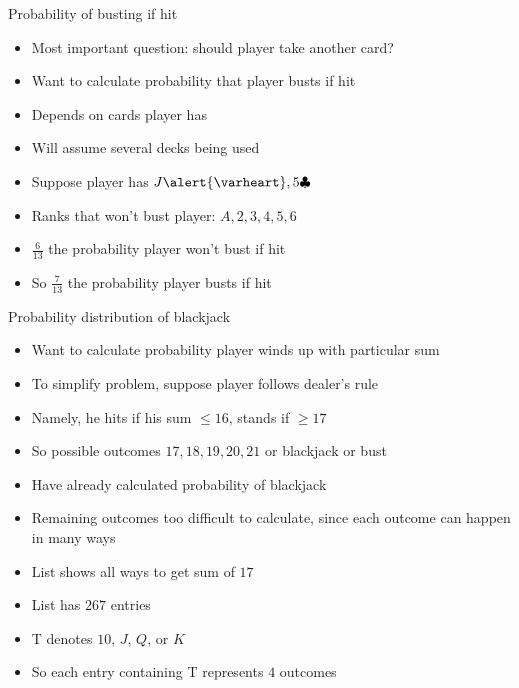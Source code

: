 \documentclass{beamer}
\theoremstyle{definition}
\newcommand{\hs}{\alert{\varheart}}
\newcommand{\cs}{\clubsuit}
\begin{document}
\begin{frame}{Probability of busting if hit}
\begin{itemize}
\item Most important question: should player take another card?
\item Want to calculate probability that player busts
if hit
\item Depends on cards player has
\item Will assume several decks being used
\end{itemize}
\begin{example}
\begin{itemize}
\item Suppose player has $J\hs,5\cs$
\item Ranks that \alert{won't} bust player:
$A,2,3,4,5,6$
\item $\frac{6}{13}$ the probability player won't bust if hit
\item So $\frac{7}{13}$ the probability player busts if hit
\end{itemize}
\end{example}
\end{frame}

\begin{frame}{Probability distribution of blackjack}
\begin{itemize}
\item Want to calculate probability player winds up with particular sum
\item To simplify problem, suppose player follows dealer's rule
\item Namely, he hits if his sum $\le 16$, stands if $\ge 17$
\item So possible outcomes $17,18,19,20,21$ or blackjack or bust
\item Have already calculated probability of blackjack
\item Remaining outcomes too difficult to calculate,
since each outcome can happen in many ways
\end{itemize}
\end{frame}

\begin{frame}
\begin{itemize}
\item List shows all ways to get sum of $17$
\item List has $267$ entries
\item \alert{T} denotes $10$, $J$, $Q$, or $K$
\item So each entry containing \alert{T}
represents $4$ outcomes
\end{itemize}

\end{frame}
\end{document}
